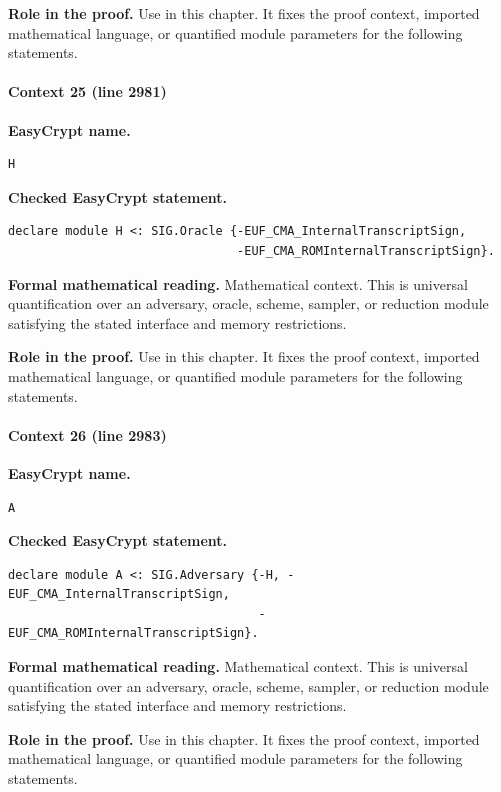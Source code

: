 \noindent\textbf{Role in the proof.}
Use in this chapter. It fixes the proof context, imported mathematical language, or quantified module parameters for the following statements.

\paragraph{Context 25 (line 2981)}
\noindent\textbf{EasyCrypt name.}
\begin{lstlisting}[language=EasyCrypt,basicstyle=\ttfamily\scriptsize]
H
\end{lstlisting}
\noindent\textbf{Checked EasyCrypt statement.}
\begin{lstlisting}[language=EasyCrypt,basicstyle=\ttfamily\scriptsize]
declare module H <: SIG.Oracle {-EUF_CMA_InternalTranscriptSign,
                                -EUF_CMA_ROMInternalTranscriptSign}.
\end{lstlisting}
\noindent\textbf{Formal mathematical reading.}
Mathematical context. This is universal quantification over an adversary, oracle, scheme, sampler, or reduction module satisfying the stated interface and memory restrictions.

\noindent\textbf{Role in the proof.}
Use in this chapter. It fixes the proof context, imported mathematical language, or quantified module parameters for the following statements.

\paragraph{Context 26 (line 2983)}
\noindent\textbf{EasyCrypt name.}
\begin{lstlisting}[language=EasyCrypt,basicstyle=\ttfamily\scriptsize]
A
\end{lstlisting}
\noindent\textbf{Checked EasyCrypt statement.}
\begin{lstlisting}[language=EasyCrypt,basicstyle=\ttfamily\scriptsize]
declare module A <: SIG.Adversary {-H, -EUF_CMA_InternalTranscriptSign,
                                   -EUF_CMA_ROMInternalTranscriptSign}.
\end{lstlisting}
\noindent\textbf{Formal mathematical reading.}
Mathematical context. This is universal quantification over an adversary, oracle, scheme, sampler, or reduction module satisfying the stated interface and memory restrictions.

\noindent\textbf{Role in the proof.}
Use in this chapter. It fixes the proof context, imported mathematical language, or quantified module parameters for the following statements.

